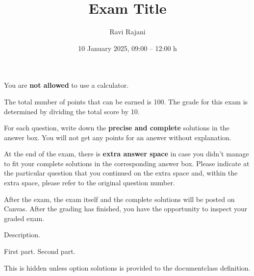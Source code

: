 \title{Exam Title}
\author{Ravi Rajani}
\date{10 January 2025, 09:00 -- 12:00 h}

\maketitle
\begin{instructions}
    \item You are \textbf{not allowed} to use a calculator.

    \item The total number of points that can be earned is 100. The grade for this exam is determined by dividing the total score by 10.

    \item For each question, write down the \textbf{precise and complete} solutions in the answer box. You will not get any points for an answer without explanation.

    \item At the end of the exam, there is \textbf{extra answer space} in case you didn't manage to fit your complete solutions in the corresponding answer box. Please indicate at the particular question that you continued on the extra space and, within the extra space, please refer to the original question number.

    \item After the exam, the exam itself and the complete solutions will be posted on Canvas. After the grading has finished, you have the opportunity to inspect your graded exam.
\end{instructions}
\begin{question}[8]
    Description.
    \begin{parts}
         First part.
         Second part.
    \end{parts}
\end{question}
\begin{soltn}
This is hidden unless option \textsf{solutions} is provided to the \textsf{documentclass} definition.
\end{soltn}
